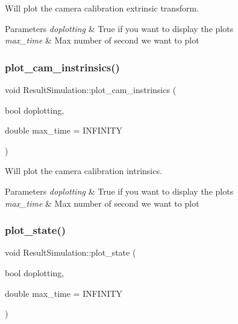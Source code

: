 Will plot the camera calibration extrinsic transform. 


\begin{DoxyParams}{Parameters}
{\em doplotting} & True if you want to display the plots \\
\hline
{\em max\+\_\+time} & Max number of second we want to plot \\
\hline
\end{DoxyParams}
\mbox{\label{classov__eval_1_1ResultSimulation_abb8a9eeb8c5e9b21c0558f27d4a9cf9a}} 
\subsubsection{\texorpdfstring{plot\+\_\+cam\+\_\+instrinsics()}{plot\_cam\_instrinsics()}}
{\footnotesize\ttfamily void Result\+Simulation\+::plot\+\_\+cam\+\_\+instrinsics (\begin{DoxyParamCaption}\item[{bool}]{doplotting,  }\item[{double}]{max\+\_\+time = {\ttfamily INFINITY} }\end{DoxyParamCaption})}



Will plot the camera calibration intrinsics. 


\begin{DoxyParams}{Parameters}
{\em doplotting} & True if you want to display the plots \\
\hline
{\em max\+\_\+time} & Max number of second we want to plot \\
\hline
\end{DoxyParams}
\mbox{\label{classov__eval_1_1ResultSimulation_aa7e8b0be0f423f9b77d29b0fb41cc715}} 
\subsubsection{\texorpdfstring{plot\+\_\+state()}{plot\_state()}}
{\footnotesize\ttfamily void Result\+Simulation\+::plot\+\_\+state (\begin{DoxyParamCaption}\item[{bool}]{doplotting,  }\item[{double}]{max\+\_\+time = {\ttfamily INFINITY} }\end{DoxyParamCaption})}



